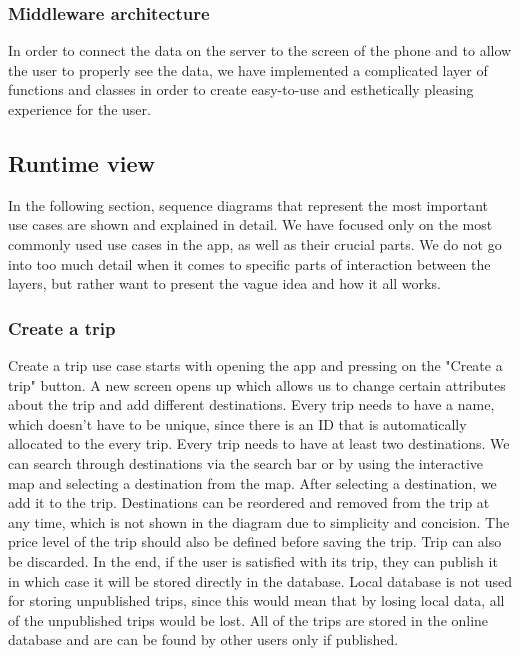 \subsubsection{Middleware architecture}
In order to connect the data on the server to the screen of the phone and to allow the user to properly see the data, we have implemented a complicated layer of functions and classes in order to create easy-to-use and esthetically pleasing experience for the user.

\subsection{Runtime view}

In the following section, sequence diagrams that represent the most important use cases are shown and explained in detail. We have focused only on the most commonly used use cases in the app, as well as their crucial parts. We do not go into too much detail when it comes to specific parts of interaction between the layers, but rather want to present the vague idea and how it all works.

\subsubsection{Create a trip}

Create a trip use case starts with opening the app and pressing on the "Create a trip" button. A new screen opens up which allows us to change certain attributes about the trip and add different destinations. Every trip needs to have a name, which doesn't have to be unique, since there is an ID that is automatically allocated to the every trip. Every trip needs to have at least two destinations. We can search through destinations via the search bar or by using the interactive map and selecting a destination from the map. After selecting a destination, we add it to the trip. Destinations can be reordered and removed from the trip at any time, which is not shown in the diagram due to simplicity and concision. The price level of the trip should also be defined before saving the trip. Trip can also be discarded. In the end, if the user is satisfied with its trip, they can publish it in which case it will be stored directly in the database. Local database is not used for storing unpublished trips, since this would mean that by losing local data, all of the unpublished trips would be lost. All of the trips are stored in the online database and are can be found by other users only if published.  

